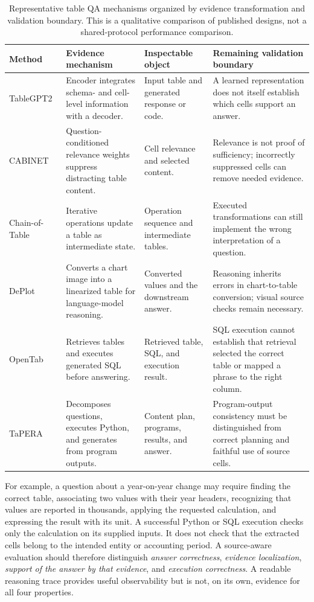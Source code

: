 \begin{table}[t]
\centering
\small
\setlength{\tabcolsep}{3pt}
\renewcommand{\arraystretch}{1.14}
\begin{tabular}{@{}p{}p{}p{}p{}@{}}
\toprule
Method & Evidence mechanism & Inspectable object & Remaining validation boundary \\
\midrule
TableGPT2~\cite{su2024tablegpt2} & Encoder integrates schema- and cell-level information with a decoder. & Input table and generated response or code. & A learned representation does not itself establish which cells support an answer. \\
CABINET~\cite{patnaik2024cabinet} & Question-conditioned relevance weights suppress distracting table content. & Cell relevance and selected content. & Relevance is not proof of sufficiency; incorrectly suppressed cells can remove needed evidence. \\
Chain-of-Table~\cite{zhang2023chainoftable} & Iterative operations update a table as intermediate state. & Operation sequence and intermediate tables. & Executed transformations can still implement the wrong interpretation of a question. \\
DePlot~\cite{liu2023deplot} & Converts a chart image into a linearized table for language-model reasoning. & Converted values and the downstream answer. & Reasoning inherits errors in chart-to-table conversion; visual source checks remain necessary. \\
OpenTab~\cite{kong2024opentab} & Retrieves tables and executes generated SQL before answering. & Retrieved table, SQL, and execution result. & SQL execution cannot establish that retrieval selected the correct table or mapped a phrase to the right column. \\
TaPERA~\cite{zhao2024tapera} & Decomposes questions, executes Python, and generates from program outputs. & Content plan, programs, results, and answer. & Program-output consistency must be distinguished from correct planning and faithful use of source cells. \\
\bottomrule
\end{tabular}
\caption{Representative table QA mechanisms organized by evidence transformation and validation boundary. This is a qualitative comparison of published designs, not a shared-protocol performance comparison.}
\label{tab:table_evidence_routes}
\end{table}

For example, a question about a year-on-year change may require finding the correct table, associating two values with their year headers, recognizing that values are reported in thousands, applying the requested calculation, and expressing the result with its unit. A successful Python or SQL execution checks only the calculation on its supplied inputs. It does not check that the extracted cells belong to the intended entity or accounting period. A source-aware evaluation should therefore distinguish \emph{answer correctness}, \emph{evidence localization}, \emph{support of the answer by that evidence}, and \emph{execution correctness}. A readable reasoning trace provides useful observability but is not, on its own, evidence for all four properties.

